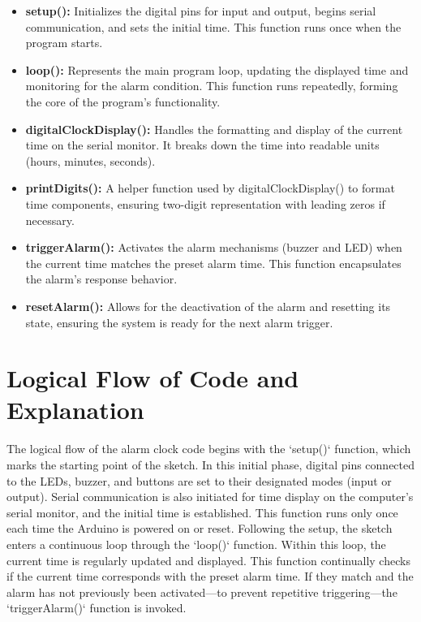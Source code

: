 \documentclass[12pt,a4paper]{article}
\begin{document}
\begin{itemize}
    \item \textbf{setup():} Initializes the digital pins for input and output, begins serial communication, and sets the initial time. This function runs once when the program starts.
    \item \textbf{loop():} Represents the main program loop, updating the displayed time and monitoring for the alarm condition. This function runs repeatedly, forming the core of the program's functionality.
    \item \textbf{digitalClockDisplay():} Handles the formatting and display of the current time on the serial monitor. It breaks down the time into readable units (hours, minutes, seconds).
    \item \textbf{printDigits():} A helper function used by digitalClockDisplay() to format time components, ensuring two-digit representation with leading zeros if necessary.
    \item \textbf{triggerAlarm():} Activates the alarm mechanisms (buzzer and LED) when the current time matches the preset alarm time. This function encapsulates the alarm's response behavior.
    \item \textbf{resetAlarm():} Allows for the deactivation of the alarm and resetting its state, ensuring the system is ready for the next alarm trigger.
\end{itemize}


\section{Logical Flow of Code and Explanation}
The logical flow of the alarm clock code begins with the `setup()` function, which marks the starting point of the sketch. In this initial phase, digital pins connected to the LEDs, buzzer, and buttons are set to their designated modes (input or output). Serial communication is also initiated for time display on the computer's serial monitor, and the initial time is established. This function runs only once each time the Arduino is powered on or reset. Following the setup, the sketch enters a continuous loop through the `loop()` function. Within this loop, the current time is regularly updated and displayed. This function continually checks if the current time corresponds with the preset alarm time. If they match and the alarm has not previously been activated—to prevent repetitive triggering—the `triggerAlarm()` function is invoked. 
\newline
\end{document}
